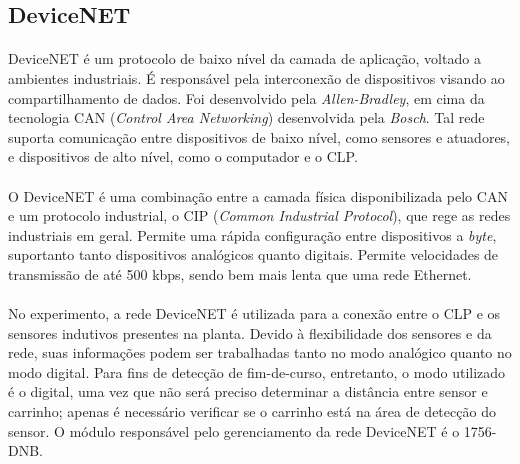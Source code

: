 \subsection{DeviceNET}
\paragraph{}DeviceNET é um protocolo de baixo nível da camada de aplicação, voltado a ambientes industriais. É responsável pela interconexão de dispositivos visando ao compartilhamento de dados. Foi desenvolvido pela \textit{Allen-Bradley}, em cima da tecnologia CAN (\textit{Control Area Networking}) desenvolvida pela \textit{Bosch}. Tal rede suporta comunicação entre dispositivos de baixo nível, como sensores e atuadores, e dispositivos de alto nível, como o computador e o CLP. 
\paragraph{}O DeviceNET é uma combinação entre a camada física disponibilizada pelo CAN e um protocolo industrial, o CIP (\textit{Common Industrial Protocol}), que rege as redes industriais em geral. Permite uma rápida configuração entre dispositivos a \textit{byte}, suportanto tanto dispositivos analógicos quanto digitais. Permite velocidades de transmissão de até 500 kbps, sendo bem mais lenta que uma rede Ethernet.
\paragraph{}No experimento, a rede DeviceNET é utilizada para a conexão entre o CLP e os sensores indutivos presentes na planta.\cite{redytton} Devido à flexibilidade dos sensores e da rede, suas informações podem ser trabalhadas tanto no modo analógico quanto no modo digital. Para fins de detecção de fim-de-curso, entretanto, o modo utilizado é o digital, uma vez que não será preciso determinar a distância entre sensor e carrinho; apenas é necessário verificar se o carrinho está na área de detecção do sensor. O módulo responsável pelo gerenciamento da rede DeviceNET é o 1756-DNB.

\begin{comment}
https://en.wikipedia.org/wiki/DeviceNet
http://ab.rockwellautomation.com/Networks-and-Communications/DeviceNet-Network
http://www.rtaautomation.com/technologies/devicenet/
https://www.odva.org/Portals/0/Library/Publications_Numbered/PUB00122R1_CIP_Brochure_ENGLISH.pdf
\end{comment}

